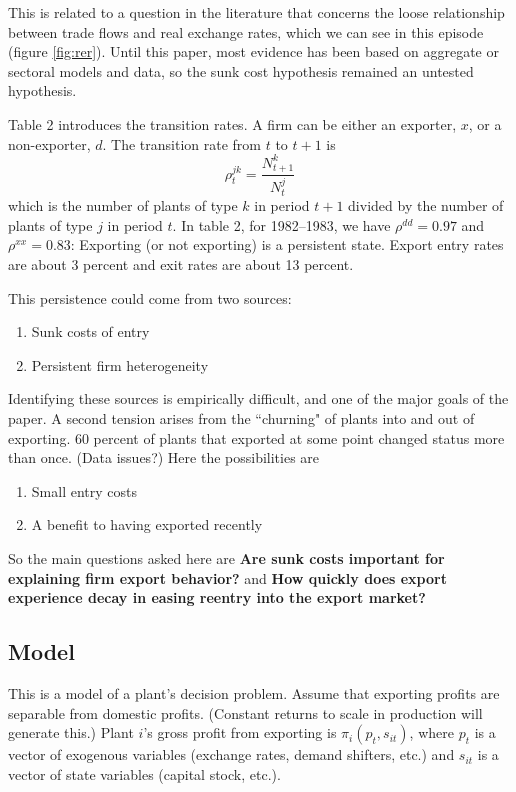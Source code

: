 \documentclass[11pt, pdftex]{article}
\begin{document}
This is related to a question in the literature that concerns the loose relationship between  trade flows and real exchange rates, which we can see in this episode (figure \ref{fig:rer}).  Until this paper, most evidence has been based on aggregate or sectoral models and data, so the sunk cost hypothesis remained an untested hypothesis.

Table 2 introduces the transition rates.  A firm can be either an exporter, $x$, or a non-exporter, $d$. The transition rate from $t$ to $t+1$ is
\begin{equation}
    \rho_t^{jk} = \frac{N_{t+1}^k}{N_t^j}
\end{equation}
which is the number of plants of type $k$ in period $t+1$ divided by the number of plants of type $j$ in period $t$. In table 2, for 1982--1983, we have $\rho^{dd}=0.97$ and $\rho^{xx}=0.83$: Exporting (or not exporting) is a persistent state.  Export entry rates are about 3 percent and exit rates are about 13 percent.

This persistence could come from two sources:
\begin{enumerate}
  \item Sunk costs of entry
  \item Persistent firm heterogeneity
\end{enumerate}
Identifying these sources is empirically difficult, and one of the major goals of  the paper. A second tension arises from the ``churning" of plants into and out of exporting.  60 percent of plants that exported at some point changed status more than once. (Data issues?)  Here the possibilities are
\begin{enumerate}
  \item Small entry costs
  \item A benefit to having exported recently
\end{enumerate}
So the main questions asked here are \textbf{Are sunk costs important for explaining firm export behavior?} and \textbf{How quickly does export experience decay in easing reentry into the export market?}
\subsection{Model}
This is a model of a plant's decision problem.  Assume that exporting profits are separable from domestic profits.  (Constant returns to scale in production will generate this.)  Plant $i$'s gross profit from exporting is $\pi_i( {p}_t,{s}_{it})$, where ${p}_t$ is a vector of exogenous variables (exchange rates, demand shifters, etc.) and ${s}_{it}$ is a vector of state variables (capital stock, etc.).
\end{document}
